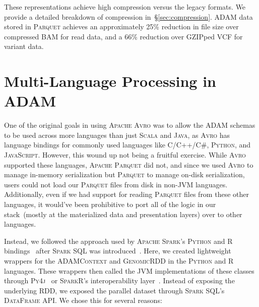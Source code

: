 \documentclass[phd]{ucbthesis}
\begin{document}
These representations achieve high compression versus the legacy formats. We provide a detailed breakdown of
compression in~\S\ref{sec:compression}. \textsc{ADAM} data stored in \textsc{Parquet} achieves an
approximately 25\% reduction in file size over compressed \textsc{BAM} for read data, and a 66\% reduction
over \textsc{GZIP}ped \textsc{VCF} for variant data.

\section{Multi-Language Processing in \textsc{ADAM}}
\label{sec:multi-language}

One of the original goals in using \textsc{Apache Avro} was to allow the
\textsc{ADAM} schemas to be used across more languages than just \textsc{Scala}
and \textsc{Java}, as \textsc{Avro} has language bindings for commonly used
languages like C/C++/C\#, \textsc{Python}, and \textsc{JavaScript}. However,
this wound up not being a fruitful exercise. While \textsc{Avro} supported these
languages, \textsc{Apache Parquet} did not, and since we used \textsc{Avro} to
manage in-memory serialization but \textsc{Parquet} to manage on-disk
serialization, users could not load our \textsc{Parquet} files from disk in
non-JVM languages. Additionally, even if we had support for reading
\textsc{Parquet} files from these other languages, it would've been prohibitive
to port all of the logic in our stack~(mostly at the materialized data and
presentation layers) over to other languages.

Instead, we followed the approach used by \textsc{Apache Spark}'s
\textsc{Python} and R bindings~\cite{venkataraman16} after \textsc{Spark SQL}
was introduced~\cite{armbrust15}. Here, we created lightweight wrappers for
the \textsc{ADAMContext} and \textsc{GenomicRDD} in the \textsc{Python} and
R languages. These wrappers then called the JVM implementations of these classes
through \textsc{Py4j}~\cite{py4j} or \textsc{SparkR}'s interoperability
layer~\cite{venkataraman16}. Instead of exposing the underlying RDD, we exposed
the parallel dataset through \textsc{Spark SQL}'s \textsc{DataFrame} API. We
chose this for several reasons:
\end{document}
